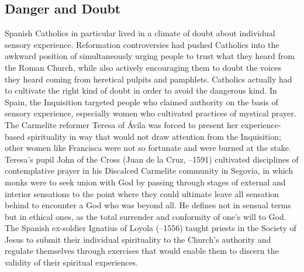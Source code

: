 \subsection{Danger and Doubt}

Spanish Catholics in particular lived in a climate of doubt about individual
sensory experience.
Reformation controversies had pushed Catholics into the awkward position of
simultaneously urging people to trust what they heard from the Roman Church,
while also actively encouraging them to doubt the voices they heard coming from
heretical pulpits and pamphlets.
Catholics actually had to cultivate the right kind of doubt in order to avoid
the dangerous kind.
In Spain, the Inquisition targeted people who claimed authority on the basis of
sensory experience, especially women who cultivated practices of mystical
prayer.
The Carmelite reformer Teresa of Ávila was forced to present her
experience-based spirituality in way that would not draw attention from the
Inquisition; other women like Francisca  were not so
fortunate and were burned at the stake.%
    \Autocites[]{Schreiner:Certainty}
    {Ahlgren:TeresaPolitics}
    {Francisca:Inquisition}
Teresa's pupil John of the Cross (Juan de la Cruz, --1591)
cultivated disciplines of contemplative prayer in his Discalced Carmelite
community in Segovia, in which monks were to seek union with God by passing
through stages of external and interior sensations to the point where they
could ultimate leave all sensation behind to encounter a God who was beyond
all.
He defines  not in sensual terms but in ethical ones, as
the total surrender and conformity of one's will to God.%
    \Autocite
    [, , ]
    {JuandelaCruz:Subida} %
The Spanish ex-soldier Ignatius of Loyola (--1556) taught priests
in the Society of Jesus to submit their individual spirituality to the Church's
authority and regulate themselves through exercises that would enable them to
discern the validity of their spiritual experiences.

